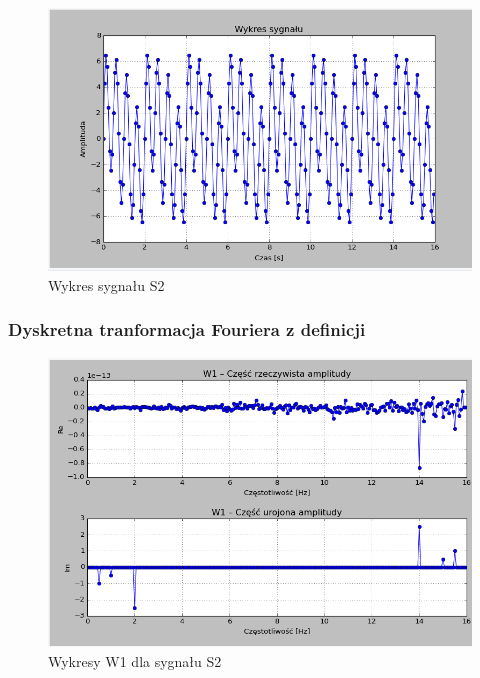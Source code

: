\documentclass{article}
\begin{document}
{        \begin{figure}[h!]
            \centering
            \includegraphics[width=\textwidth]{img/S2.png}
            \caption{Wykres sygnału S2}
        \end{figure}
        \FloatBarrier

        \subsubsection{Dyskretna tranformacja Fouriera z definicji}

                \FloatBarrier
                \begin{figure}[h!]
                    \centering
                    \includegraphics[width=1\textwidth]{img/w1s2.png}
                    \caption{Wykresy W1 dla sygnału S2}
                \end{figure}

}
\end{document}
